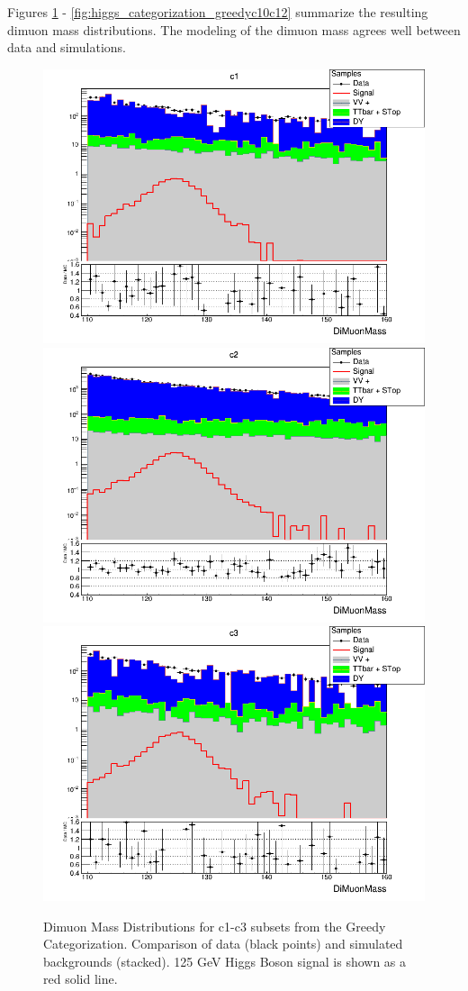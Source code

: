 Figures \ref{fig:higgs_categorization_greedyc1c3} - \ref{fig:higgs_categorization_greedyc10c12} summarize the resulting dimuon mass distributions. The modeling of the dimuon mass agrees well between data and simulations.
\begin{figure}[htbp]
  \centering
  \includegraphics[width=0.65\linewidth]{figures/ch_higgs/distributions/bdt_uf/distribution__c1__DiMuonMass__logY.png}\\
  \includegraphics[width=0.65\linewidth]{figures/ch_higgs/distributions/bdt_uf/distribution__c2__DiMuonMass__logY.png}\\
  \includegraphics[width=0.65\linewidth]{figures/ch_higgs/distributions/bdt_uf/distribution__c3__DiMuonMass__logY.png}
  \caption{Dimuon Mass Distributions for c1-c3 subsets from the Greedy Categorization. Comparison of data (black points) and simulated backgrounds (stacked). 125 GeV Higgs Boson signal is shown as a red solid line.}
  \label{fig:higgs_categorization_greedyc1c3}
\end{figure}
